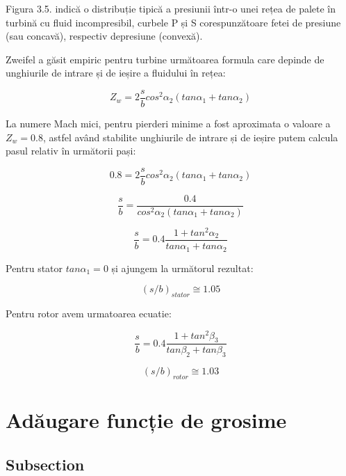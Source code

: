 Figura 3.5. indică o distribuție tipică a presiunii într-o unei rețea de palete în turbină cu fluid incompresibil, curbele P și S corespunzătoare fetei de presiune (sau concavă), respectiv depresiune (convexă).

Zweifel a găsit empiric pentru turbine următoarea formula care depinde de unghiurile de intrare și de ieșire a fluidului în rețea:

\begin{equation}
Z_w = 2 \frac{s}{b} cos^2\alpha_2 (tan\alpha_1 + tan\alpha_2)
\end{equation}

La numere Mach mici, pentru pierderi minime a fost aproximata o valoare a $Z_w = 0.8$, astfel având stabilite unghiurile de intrare și de ieșire putem calcula pasul relativ în următorii pași:

\begin{equation}
0.8 = 2 \frac{s}{b} cos^2\alpha_2 (tan\alpha_1 + tan\alpha_2)
\end{equation}

\begin{equation}
\frac{s}{b} = \frac{0.4}{cos^2\alpha_2 (tan\alpha_1 + tan\alpha_2)}
\end{equation}

\begin{equation}
\frac{s}{b} = 0.4 \frac{1+tan^2\alpha_2}{tan\alpha_1 + tan\alpha_2}
\end{equation}

\vspace{5mm} %

Pentru stator $tan\alpha_1 = 0$ și ajungem la următorul rezultat:

\begin{equation}
(s/b)_{stator} \cong 1.05
\end{equation}

\vspace{5mm} %

Pentru rotor avem urmatoarea ecuatie:

\begin{equation}
\frac{s}{b} = 0.4 \frac{1+tan^2\beta_3}{tan\beta_2 + tan\beta_3}
\end{equation}

\begin{equation}
(s/b)_{rotor} \cong 1.03
\end{equation}

\clearpage


\section{Adăugare funcție de grosime}

\subsection{Subsection}